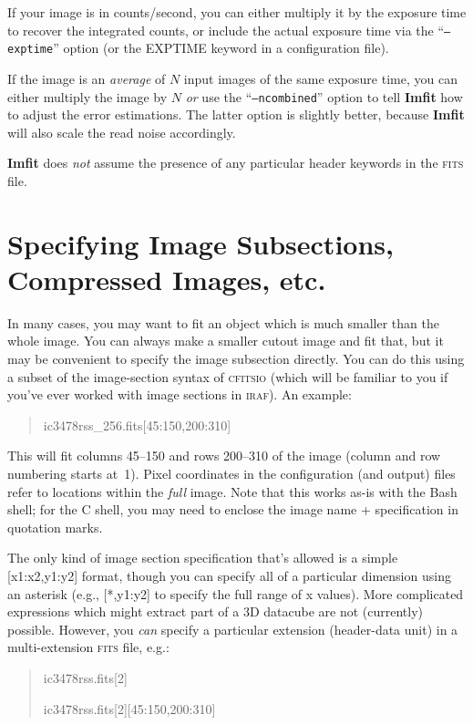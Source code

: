 \documentclass[10pt,a4paper,article]{memoir}
\newcommand{\imfit}{\textbf{Imfit}}
\newcommand{\Imfit}{\textbf{Imfit}}
\begin{document}
If your image is in counts/second, you can either multiply it by the
exposure time to recover the integrated counts, or include the actual
exposure time via the ``\texttt{--exptime}'' option (or the EXPTIME keyword
in a configuration file).

If the image is an \textit{average} of $N$ input images of the same exposure time, you
can either multiply the image by $N$ \textit{or} use the ``\texttt{--ncombined}'' option
to tell \imfit{} how to adjust the error estimations.  The latter option is slightly
better, because \imfit{} will also scale the read noise accordingly.

\Imfit{} does \textit{not} assume the presence of any particular header
keywords in the \textsc{fits} file.




\section{Specifying Image Subsections, Compressed Images, etc.}

In many cases, you may want to fit an object which is much smaller than the whole
image. You can always make a smaller cutout image and fit that, but it may be convenient to
specify the image subsection directly. You can do this using a subset of the image-section
syntax of \textsc{cfitsio} (which will be familiar to you if you've ever worked with
image sections in \textsc{iraf}). An example:

\begin{quote}
ic3478rss\_256.fits[45:150,200:310]
\end{quote}
This will fit columns 45--150 and rows 200--310 of the image (column and row
numbering starts at~1). Pixel coordinates in the configuration (and output)
files refer to locations within the \textit{full} image. Note that this works
as-is with the Bash shell; for the C shell, you may need to enclose the image name + 
specification in quotation marks.

The only kind of image section specification that's allowed is a simple
[x1:x2,y1:y2] format, though you can specify all of a particular dimension using
an asterisk (e.g., [*,y1:y2] to specify the full range of x values). More
complicated expressions which might extract part of a 3D datacube are not
(currently) possible. However, you \textit{can} specify a particular extension
(header-data unit) in a multi-extension \textsc{fits} file, e.g.:

\begin{quote}
ic3478rss.fits[2]

ic3478rss.fits[2][45:150,200:310]
\end{quote}
\end{document}
